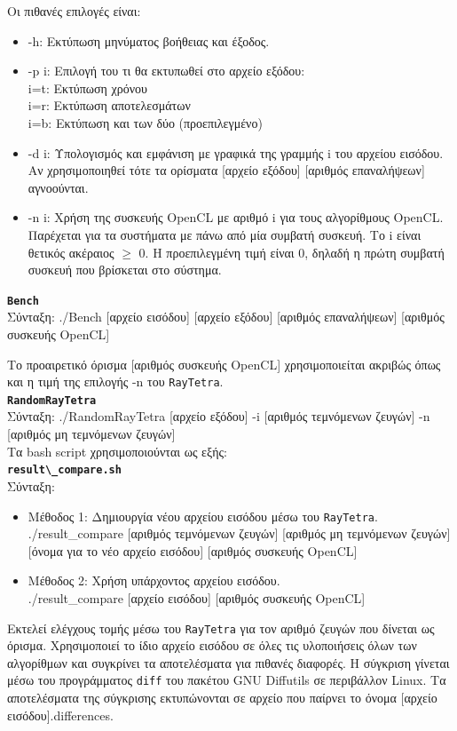 \noindent Οι πιθανές επιλογές είναι:
\begin{itemize}
\item -h:   Εκτύπωση μηνύματος βοήθειας και έξοδος.\\
\item -p i: Επιλογή του τι θα εκτυπωθεί στο αρχείο εξόδου:\\
      i=t: Εκτύπωση χρόνου\\
      i=r: Εκτύπωση αποτελεσμάτων\\
      i=b: Εκτύπωση και των δύο (προεπιλεγμένο)\\
\item -d i: Υπολογισμός και εμφάνιση με γραφικά της γραμμής i του αρχείου εισόδου. Αν χρησιμοποιηθεί τότε τα ορίσματα [αρχείο εξόδου] [αριθμός επαναλήψεων] αγνοούνται.
\item -n i: Χρήση της συσκευής OpenCL με αριθμό i για τους αλγορίθμους OpenCL. Παρέχεται για τα συστήματα με πάνω από μία συμβατή συσκευή. Το i είναι θετικός ακέραιος $\geq$ 0. Η προεπιλεγμένη τιμή είναι 0, δηλαδή η πρώτη συμβατή συσκευή που βρίσκεται στο σύστημα.\\
\end{itemize}

\noindent\textbf{\verb!Bench!}\\
Σύνταξη:  ./Bench [αρχείο εισόδου] [αρχείο εξόδου] [αριθμός επαναλήψεων] [αριθμός συσκευής OpenCL]

\noindent Το προαιρετικό όρισμα [αριθμός συσκευής OpenCL] χρησιμοποιείται ακριβώς όπως και η τιμή της επιλογής -n του \verb!RayTetra!.\\
           
\noindent\textbf{\verb!RandomRayTetra!}\\
Σύνταξη:  ./RandomRayTetra [αρχείο εξόδου] -i [αριθμός τεμνόμενων ζευγών] -n [αριθμός μη τεμνόμενων ζευγών]\\

\noindent Τα bash script χρησιμοποιούνται ως εξής: \\

\noindent\textbf{\verb!result\_compare.sh!}\\
Σύνταξη:\\
\begin{itemize}
\item Μέθοδος 1: Δημιουργία νέου αρχείου εισόδου μέσω του \verb!RayTetra!.\\
./result\_compare [αριθμός τεμνόμενων ζευγών] [αριθμός μη τεμνόμενων ζευγών] [όνομα για το νέο αρχείο εισόδου] [αριθμός συσκευής OpenCL]
\item Μέθοδος 2: Χρήση υπάρχοντος αρχείου εισόδου.\\
 ./result\_compare [αρχείο εισόδου]  [αριθμός συσκευής OpenCL]   
\end{itemize} 
\noindent Εκτελεί ελέγχους τομής μέσω του \verb!RayTetra! για τον αριθμό ζευγών που δίνεται ως όρισμα. Χρησιμοποιεί το ίδιο αρχείο εισόδου σε όλες τις υλοποιήσεις όλων των αλγορίθμων και συγκρίνει τα αποτελέσματα για πιθανές διαφορές. Η σύγκριση γίνεται μέσω του προγράμματος \verb!diff! του πακέτου GNU Diffutils σε περιβάλλον Linux. Τα αποτελέσματα της σύγκρισης εκτυπώνονται σε αρχείο που παίρνει το όνομα [αρχείο εισόδου].differences.\\


